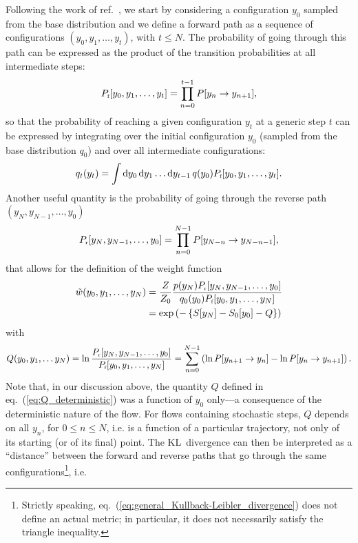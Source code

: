 \documentclass[11pt]{article}
\newcommand{\dd}{{\rm{d}}}
\begin{document}
Following the work of ref.~\cite{Wu:2020snf}, we start by considering a configuration $y_0$ sampled from the base distribution and we define a forward path as a sequence of configurations $(y_0,y_1,\dots,y_t)$, with $t\le N$. The probability of going through this path can be expressed as the product of the transition probabilities at all intermediate steps:
\begin{equation}
P_{\mbox{\tiny{f}}}[y_0,y_1,\dots,y_t]=\prod_{n=0}^{t-1} P[y_n \to y_{n+1}],
\end{equation}
so that the probability of reaching a given configuration $y_t$ at a generic step $t$ can be expressed by integrating over the initial configuration $y_0$ (sampled from the base distribution $q_0$) and over all intermediate configurations:
\begin{equation}
\label{reach_yn_in_stochastic_normalizing_flow}
q_t(y_t)=\int \dd y_0  \, \dd y_1 \dots \dd y_{t-1} \, q(y_0) P_{\mbox{\tiny{f}}}[y_0,y_1,\dots,y_t].
\end{equation}
Another useful quantity is the probability of going through the reverse path $(y_N,y_{N-1},\dots,y_0)$
\begin{equation}
P_{\mbox{\tiny{r}}}[y_N,y_{N-1},\dots,y_0]=\prod_{n=0}^{N-1} P[y_{N-n} \to y_{N-n-1}],
\end{equation}
that allows for the definition of the weight function
\begin{align}
\label{eq:tilde_w_general}
\tilde{w}(y_0,y_1,\dots, y_N)
 &=\frac{Z}{Z_0} \frac{p(y_N) P_{\mbox{\tiny{r}}}[y_N,y_{N-1},\dots, y_0]}{q_0(y_0) P_{\mbox{\tiny{f}}}[y_0,y_1,\dots, y_N]} \\
 &= \exp\left( - \left\{ S[y_N]- S_0[y_0] - Q\right\} \right)
\end{align}
with 
\begin{equation}
\label{eq:Q_general_definition}
Q(y_0, y_1, \dots y_N) = \ln \frac{P_{\mbox{\tiny{r}}}[y_N,y_{N-1},\dots,y_0]}{P_{\mbox{\tiny{f}}}[y_0,y_1,\dots,y_N]} =\sum_{n=0}^{N-1} \left( \ln P[y_{n+1} \to y_n] -\ln P[y_n \to y_{n+1}] \right).
\end{equation}
Note that, in our discussion above, the quantity $Q$ defined in eq.~(\ref{eq:Q_deterministic}) was a function of $y_0$ only---a consequence of the deterministic nature of the flow. For flows containing stochastic steps, $Q$ depends on all $y_n$, for $0 \le n \le N$, i.e. is a function of a particular trajectory, not only of its starting (or of its final) point. The KL~divergence can then be interpreted as a ``distance'' between the forward and reverse paths that go through the same configurations\footnote{Strictly speaking, eq.~(\ref{eq:general_Kullback-Leibler_divergence}) does not define an actual metric; in particular, it does not necessarily satisfy the triangle inequality.}, i.e.
\end{document}
